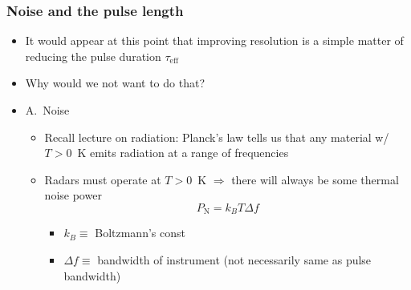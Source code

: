 \documentclass[11pt, oneside]{article}
\newcommand{\teff}{\tau_\mathrm{eff}}
\newcommand{\PN}{P_\mathrm{N}}
\begin{document}
\subsubsection{Noise and the pulse length}

\begin{itemize}
	\item[--] It would appear at this point that improving resolution is a simple matter of reducing the pulse duration $\teff$
	\item[--] Why would we not want to do that?
	\item[--] A.\ Noise
	\begin{itemize}
		\item Recall lecture on radiation: Planck's law tells us that any material w/ $T > 0$~K emits radiation at a range of frequencies
		\item Radars must operate at $T > 0$~K $\Rightarrow$ there will always be some thermal noise power
		\begin{equation}
			\label{e:PN}
			\PN = k_BT\Delta f
		\end{equation}
		\begin{itemize}
			\item[] $k_B \equiv$ Boltzmann's const
			\item[] $\Delta f \equiv$ bandwidth of instrument (not necessarily same as pulse bandwidth)
		\end{itemize}

\end{itemize}
\end{itemize}
\end{document}
